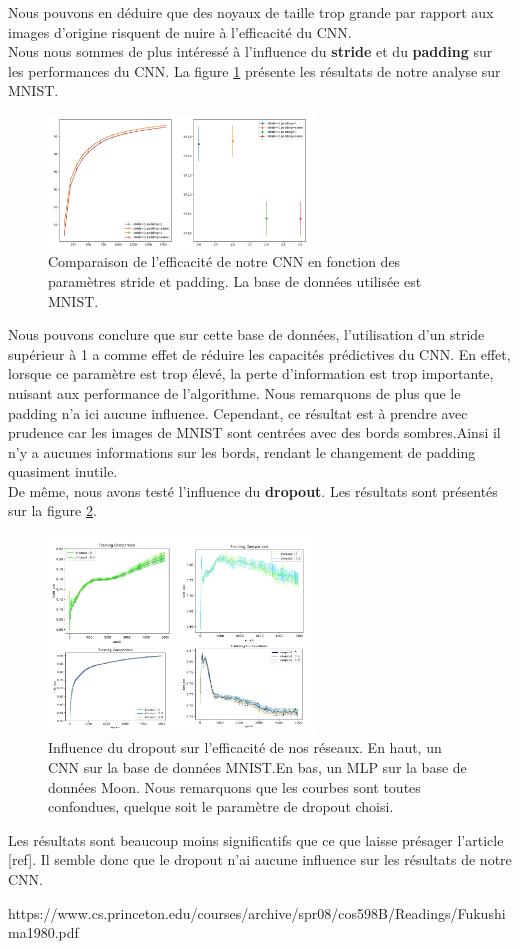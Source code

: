 Nous pouvons en déduire que des noyaux de taille trop grande par rapport aux images d'origine risquent de nuire à l'efficacité du CNN. \\

Nous nous sommes de plus intéressé à l'influence du \textbf{stride} et du \textbf{padding} sur les performances du CNN. La figure \ref{resultat_padding_stride} présente les résultats de notre analyse sur MNIST.

\begin{figure}[!h]
\centering
\includegraphics[width=200pt]{images/cnn/CNN_padding_stride.png}
\caption{Comparaison de l'efficacité de notre CNN en fonction des paramètres stride et padding. La base de données utilisée est MNIST.}
\label{resultat_padding_stride}
\end{figure}

Nous pouvons conclure que sur cette base de données, l'utilisation d'un stride supérieur à 1 a comme effet de réduire les capacités prédictives du CNN. En effet, lorsque ce paramètre est trop élevé, la perte d'information est trop importante, nuisant aux performance de l'algorithme. Nous remarquons de plus que le padding n'a ici aucune influence. Cependant, ce résultat est à prendre avec prudence car les images de MNIST sont centrées avec des bords sombres.Ainsi il n'y a aucunes informations sur les bords, rendant le changement de padding quasiment inutile. \\

De même, nous avons testé l'influence du \textbf{dropout}. Les résultats sont présentés sur la figure \ref{resultat_dropout}.
  
\begin{figure}[!h]
\centering
\includegraphics[width=200pt]{images/cnn/resultat_dropout.png}
\caption{Influence du dropout sur l'efficacité de nos réseaux. En haut, un CNN sur la base de données MNIST.En bas, un MLP sur la base de données Moon. Nous remarquons que les courbes sont toutes confondues, quelque soit le paramètre de dropout choisi.}
\label{resultat_dropout}
\end{figure}

Les résultats sont beaucoup moins significatifs que ce que laisse présager l'article [ref]. Il semble donc que le dropout n'ai aucune influence sur les résultats de notre CNN. 

https://www.cs.princeton.edu/courses/archive/spr08/cos598B/Readings/Fukushima1980.pdf


